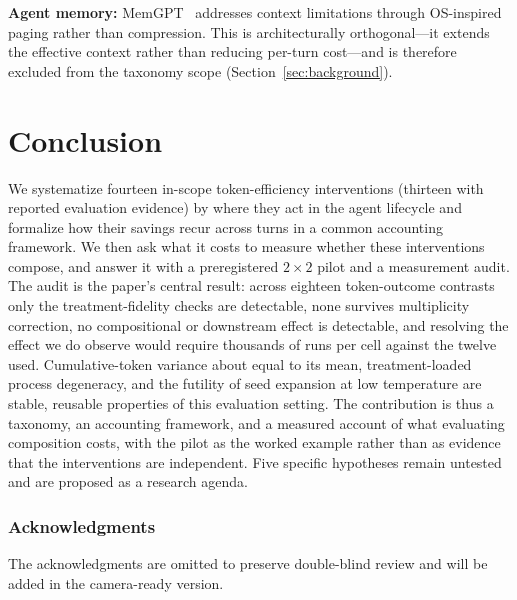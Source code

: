 \documentclass{article}
\newif\ifanon\anontrue
\begin{document}
\textbf{Agent memory:} MemGPT~\citep{memgpt2023} addresses context limitations through OS-inspired paging rather than compression. This is architecturally orthogonal---it extends the effective context rather than reducing per-turn cost---and is therefore excluded from the taxonomy scope (Section~\ref{sec:background}).

\section{Conclusion}
\label{sec:conclusion}

We systematize fourteen in-scope token-efficiency interventions (thirteen with reported evaluation evidence) by where they act in the agent lifecycle and formalize how their savings recur across turns in a common accounting framework. We then ask what it costs to measure whether these interventions compose, and answer it with a preregistered $2{\times}2$ pilot and a measurement audit. The audit is the paper's central result: across eighteen token-outcome contrasts only the treatment-fidelity checks are detectable, none survives multiplicity correction, no compositional or downstream effect is detectable, and resolving the effect we do observe would require thousands of runs per cell against the twelve used. Cumulative-token variance about equal to its mean, treatment-loaded process degeneracy, and the futility of seed expansion at low temperature are stable, reusable properties of this evaluation setting. The contribution is thus a taxonomy, an accounting framework, and a measured account of what evaluating composition costs, with the pilot as the worked example rather than as evidence that the interventions are independent. Five specific hypotheses remain untested and are proposed as a research agenda.

\subsubsection*{Acknowledgments}
\ifanon
The acknowledgments are omitted to preserve double-blind review and will be added in the camera-ready version.
\else
The authors did not receive support from any organization for the submitted work and have no competing interests to disclose. Ethics approval, consent to participate, and consent for publication are not applicable.
\fi
\end{document}
